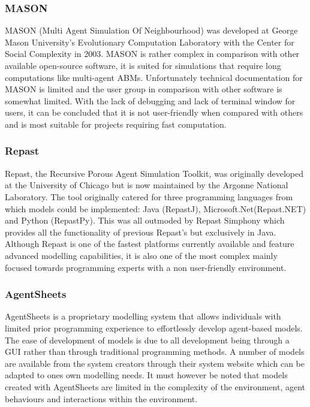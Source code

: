 \documentclass[11pt]{informatics-report}
\begin{document}
\subsubsection{MASON}
MASON (Multi Agent Simulation Of Neighbourhood) was developed at George Mason University's Evolutionary Computation Laboratory with the Center for Social Complexity in 2003. MASON is rather complex in comparison with other available open-source software, it is suited for simulations that require long computations like multi-agent ABMs. Unfortunately technical documentation for MASON is limited and the user group in comparison with other software is somewhat limited. With the lack of debugging and lack of terminal window for users, it can be concluded that it is not user-friendly when compared with others and is most suitable for projects requiring fast computation.

\subsubsection{Repast}
Repast, the Recursive Porous Agent Simulation Toolkit, was originally developed at the University of Chicago but is now maintained by the Argonne National Laboratory. The tool originally catered for three programming languages from which models could be implemented: Java (RepastJ), Microsoft.Net(Repast.NET) and Python (RepastPy). This was all outmoded by Repast Simphony which provides all the functionality of previous Repast's but exclusively in Java. Although Repast is one of the fastest platforms currently available and feature advanced modelling capabilities, it is also one of the most complex mainly focused towards programming experts with a non user-friendly environment. 

\subsubsection{AgentSheets}
AgentSheets is a proprietary modelling system that allows individuals with limited prior programming experience to effortlessly develop agent-based models. The ease of development of models is due to all development being through a GUI rather than through traditional programming methods. A number of models are available from the system creators through their system website which can be adapted to ones own modelling needs. It must however be noted that models created with AgentSheets are limited in the complexity of the environment, agent behaviours and interactions within the environment. 
\end{document}
